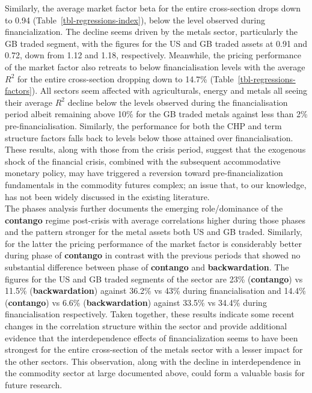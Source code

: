 \documentclass[
  authoryear,
  preprint,
  3p]{elsarticle}
\begin{document}
Similarly, the average market factor beta for the entire cross-section
drops down to 0.94 (Table~\ref{tbl-regressions-index}), below the level
observed during financialization. The decline seems driven by the metals
sector, particularly the GB traded segment, with the figures for the US
and GB traded assets at 0.91 and 0.72, down from 1.12 and 1.18,
respectively. Meanwhile, the pricing performance of the market factor
also retreats to below financialisation levels with the average
\(R^{2}\) for the entire cross-section dropping down to 14.7\%
(Table~\ref{tbl-regressions-factors}). All sectors seem affected with
agriculturals, energy and metals all seeing their average \(R^{2}\)
decline below the levels observed during the financialisation period
albeit remaining above 10\% for the GB traded metals against less than
2\% pre-financialisation. Similarly, the performance for both the CHP
and term structure factors falls back to levels below those attained
over financialisation. These results, along with those from the crisis
period, suggest that the exogenous shock of the financial crisis,
combined with the subsequent accommodative monetary policy, may have
triggered a reversion toward pre-financialization fundamentals in the
commodity futures complex; an issue that, to our knowledge, has not been
widely discussed in the existing literature.\\
The phases analysis further documents the emerging role/dominance of the
\textbf{contango} regime post-crisis with average correlations higher
during those phases and the pattern stronger for the metal assets both
US and GB traded. Similarly, for the latter the pricing performance of
the market factor is considerably better during phase of
\textbf{contango} in contrast with the previous periods that showed no
substantial difference between phase of \textbf{contango} and
\textbf{backwardation}. The figures for the US and GB traded segments of
the sector are 23\% (\textbf{contango}) vs 11.5\%
(\textbf{backwardation}) against 36.2\% vs 43\% during financialisation
and 14.4\% (\textbf{contango}) vs 6.6\% (\textbf{backwardation}) against
33.5\% vs 34.4\% during financialisation respectively. Taken together,
these results indicate some recent changes in the correlation structure
within the sector and provide additional evidence that the
interdependence effects of financialization seems to have been strongest
for the entire cross-section of the metals sector with a lesser impact
for the other sectors. This observation, along with the decline in
interdependence in the commodity sector at large documented above, could
form a valuable basis for future research.
\end{document}
